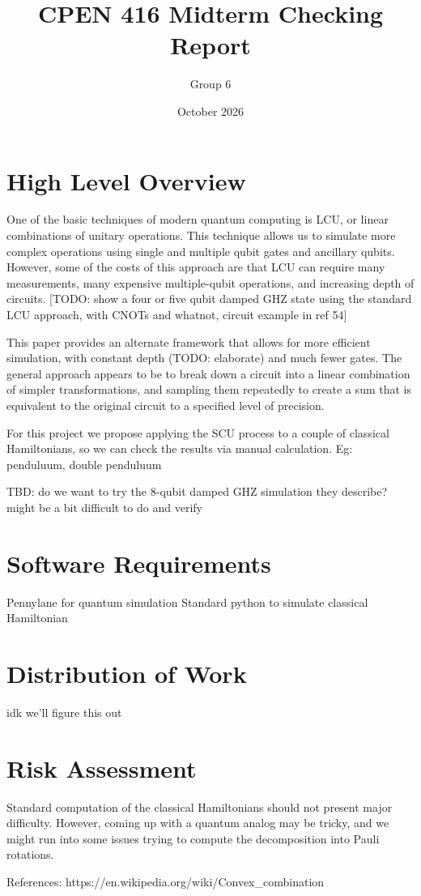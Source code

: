 \documentclass{article}
\title{CPEN 416 Midterm Checking Report}
\author{Group 6 }
\date{October 2026}
\begin{document}
\maketitle

\section{High Level Overview}
One of the basic techniques of modern quantum computing is LCU, or linear combinations of unitary operations. This technique allows us to simulate more complex operations using single and multiple qubit gates and ancillary qubits. However, some of the costs of this approach are that LCU can require many measurements, many expensive multiple-qubit operations, and increasing depth of circuits.
[TODO: show a four or five qubit damped GHZ state using the standard LCU approach, with CNOTs and whatnot, circuit example in ref 54]

This paper provides an alternate framework that allows for more efficient simulation, with constant depth (TODO: elaborate) and much fewer gates. The general approach appears to be to break down a circuit into a linear combination of simpler transformations, and sampling them repeatedly to create a sum that is equivalent to the original circuit to a specified level of precision.

For this project we propose applying the SCU process to a couple of classical Hamiltonians, so we can check the results via manual calculation. Eg: penduluum, double penduluum

TBD: do we want to try the 8-qubit damped GHZ simulation they describe? might be a bit difficult to do and verify

\section{Software Requirements}
Pennylane for quantum simulation
Standard python to simulate classical Hamiltonian

\section{Distribution of Work}
idk we'll figure this out

\section{Risk Assessment}
Standard computation of the classical Hamiltonians should not present major difficulty. However, coming up with a quantum analog may be tricky, and we might run into some issues trying to compute the decomposition into Pauli rotations.

References:
https://en.wikipedia.org/wiki/Convex_combination
\end{document}
